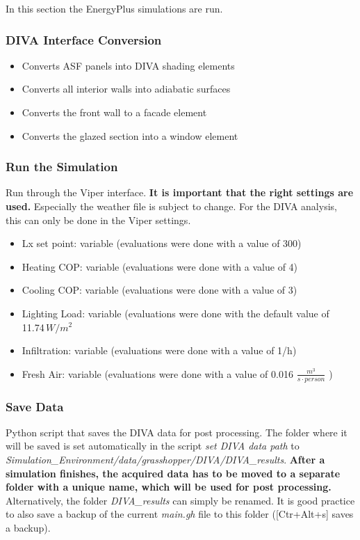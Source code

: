 	In this section the EnergyPlus simulations are run.

		\subsubsection{DIVA Interface Conversion}
		\begin{itemize}
		\item{Converts ASF panels into DIVA shading elements}
		\item{Converts all interior walls into adiabatic surfaces}
		\item{Converts the front wall to a facade element}
		\item{Converts the glazed section into a window element}
		\end{itemize}

		\subsubsection{Run the Simulation}
		Run through the Viper interface. {\bf It is important that the right settings are used.} Especially the weather file is subject to change. For the DIVA analysis, this can only be done in the Viper settings. 
		\begin{itemize}
		\item{Lx set point: variable (evaluations were done with a value of 300)}
		\item{Heating COP: variable (evaluations were done with a value of 4)}
		\item{Cooling COP: variable (evaluations were done with a value of 3)}
		\item{Lighting Load: variable (evaluations were done with the default value of 11.74\,$W/m^2$}
		\item{Infiltration: variable (evaluations were done with a value of 1/h)}
		\item{Fresh Air: variable (evaluations were done with a value of 0.016 $\frac{m^3}{s\cdot person}$ )}
		\end{itemize}

		\subsubsection{Save Data}
		Python script that saves the DIVA data for post processing. The folder where it will be saved is set automatically in the script \emph{set DIVA data path} to \emph{Simulation\_Environment/data/grasshopper/DIVA/DIVA\_results}. {\bf After a simulation finishes, the acquired data has to be moved to a separate folder with a unique name, which will be used for post processing.} Alternatively, the folder \emph{DIVA\_results} can simply be renamed. It is good practice to also save a backup of the current \emph{main.gh} file to this folder ([Ctr+Alt+s] saves a backup). 

